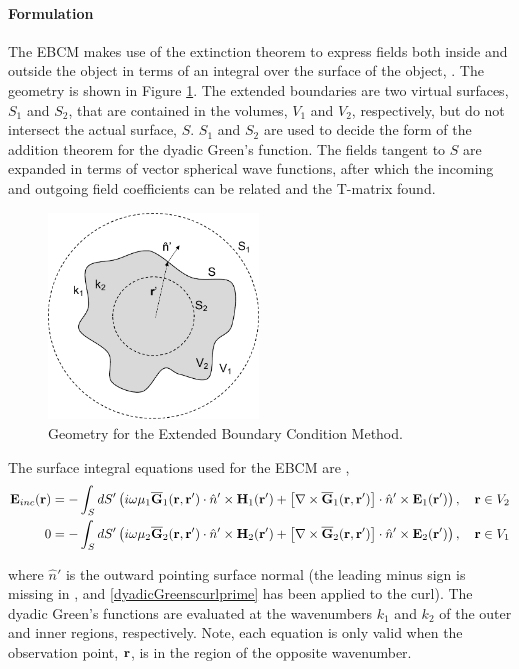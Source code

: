 \paragraph{Formulation}
The EBCM makes use of the extinction theorem to express fields both inside and outside the object in terms of an integral over the surface of the object, \cite{chew1995waves}. The geometry is shown in Figure \ref{geoebcm}. The extended boundaries are two virtual surfaces, $S_1$ and $S_2$, that are contained in the volumes, $V_1$ and $V_2$, respectively, but do not intersect the actual surface, $S$. $S_1$ and $S_2$ are used to decide the form of the addition theorem for the dyadic Green's function. The fields tangent to $S$ are expanded in terms of vector spherical wave functions, after which the incoming and outgoing field coefficients can be related and the T-matrix found.  


\begin{figure}[H] 
   \centering
   \includegraphics[width=2.2in]{Tmatrix/Figures/ebcm} 
   \caption{Geometry for the Extended Boundary Condition Method.}
   \label{geoebcm}
\end{figure}

The surface integral equations used for the EBCM are \cite{chew1995waves,duan2015experimental}, 
\begin{align}
\mathbf{E}_{inc}(\mathbf{r}) &= -\int_S dS'\left( i \omega \mu_1 \overline{\mathbf{G}}_{1}(\mathbf{r},\mathbf{r}') \cdot \hat{n}' \times \mathbf{H}_1(\mathbf{r}') + \left[\nabla\times \overline{\mathbf{G}}_{1}(\mathbf{r},\mathbf{r}') \right] \cdot \hat{n}' \times \mathbf{E}_1(\mathbf{r}') \right), \quad \mathbf{r} \in V_2  \label{ebcmSIEV2}\\
0 &= -\int_S dS'\left( i \omega \mu_2 \overline{\mathbf{G}}_{2}(\mathbf{r},\mathbf{r}') \cdot \hat{n}' \times \mathbf{H}_2(\mathbf{r}') + \left[\nabla\times \overline{\mathbf{G}}_{2}(\mathbf{r},\mathbf{r}') \right] \cdot \hat{n}' \times \mathbf{E}_2(\mathbf{r}') \right), \quad \mathbf{r} \in V_1  \label{ebcmSIEV1}
\end{align}

\noindent where $\hat{n}'$ is the outward pointing surface normal (the leading minus sign is missing in \cite{chew1995waves}, and \eqref{dyadicGreenscurlprime} has been applied to the curl). The dyadic Green's functions are evaluated at the wavenumbers $k_1$ and $k_2$ of the outer and inner regions, respectively.  Note, each equation is only valid when the observation point, $\mathbf{r}$, is in the region of the opposite wavenumber. 

